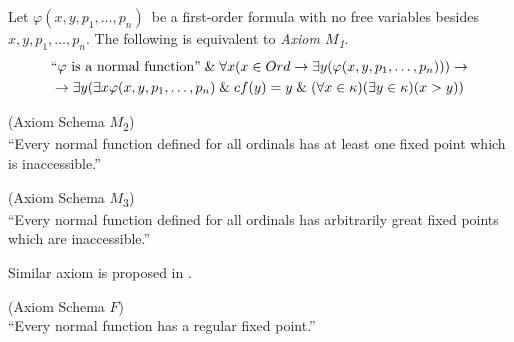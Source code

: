 Let $\varphi(x, y, p_1, \ldots, p_n)$ be a first-order formula with no free variables besides $x, y, p_1, \ldots, p_n$. The following is equivalent to \emph{Axiom $M$\textsubscript{1}}.
\begin{equation}
\begin{gathered}
\mbox{``$\varphi$ is a normal function''} \et \forall x (x \in Ord \then \exists y(\varphi(x, y, p_1, \ldots, p_n))) \then\\
\then \exists y (\exists x \varphi(x, y, p_1, \ldots, p_n) \et cf(y) = y \et (\forall x \in \kappa)(\exists y \in \kappa)(x > y))
\end{gathered}
\end{equation}

\begin{definition}{(Axiom Schema $M$\textsubscript{2})}\\
``Every normal function defined for all ordinals has at least one fixed point which is inaccessible.''
\end{definition}

\begin{definition}{(Axiom Schema $M$\textsubscript{3})}\\
``Every normal function defined for all ordinals has arbitrarily great fixed points which are inaccessible.''
\end{definition}

Similar axiom is proposed in \cite{DrakeBook}.
\begin{definition}{(Axiom Schema $F$)}\label{def:axiom_f}\\
``Every normal function has a regular fixed point.''
\end{definition}

